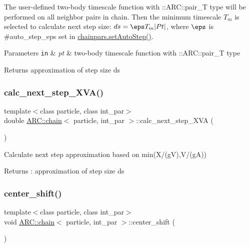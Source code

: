 The user-\/defined two-\/body timescale function with \+::\+A\+R\+C\+::pair\+\_\+T type will be performed on all neighbor pairs in chain. Then the minimum timescale $ T_m$ is selected to calculate next step size\+: $ ds = \eps T_m |Pt|$, where $\eps$ is \#auto\+\_\+step\+\_\+eps set in \hyperlink{classARC_1_1chainpars_a2aa8600eba0330eb16c122a58edbb465}{chainpars.\+set\+Auto\+Step()}. 
\begin{DoxyParams}[1]{Parameters}
\mbox{\tt in}  & {\em pt} & two-\/body timescale function with \+::\+A\+R\+C\+::pair\+\_\+T type \\
\hline
\end{DoxyParams}
\begin{DoxyReturn}{Returns}
approximation of step size ds 
\end{DoxyReturn}
\hypertarget{classARC_1_1chain_a282545e539f7402b1d44bf285730490a}{}\label{classARC_1_1chain_a282545e539f7402b1d44bf285730490a} 
\subsubsection{\texorpdfstring{calc\+\_\+next\+\_\+step\+\_\+\+X\+V\+A()}{calc\_next\_step\_XVA()}}
{\footnotesize\ttfamily template$<$class particle, class int\+\_\+par$>$ \\
double \hyperlink{classARC_1_1chain}{A\+R\+C\+::chain}$<$ particle, int\+\_\+par $>$\+::calc\+\_\+next\+\_\+step\+\_\+\+X\+VA (\begin{DoxyParamCaption}{ }\end{DoxyParamCaption})\hspace{0.3cm}{\ttfamily [inline]}}



Calculate next step approximation based on min(X/(gV),V/(gA)) 

\begin{DoxyReturn}{Returns}
\+: approximation of step size ds 
\end{DoxyReturn}
\hypertarget{classARC_1_1chain_a73419f14f724668f4858a13c01cf7b70}{}\label{classARC_1_1chain_a73419f14f724668f4858a13c01cf7b70} 
\subsubsection{\texorpdfstring{center\+\_\+shift()}{center\_shift()}}
{\footnotesize\ttfamily template$<$class particle, class int\+\_\+par$>$ \\
void \hyperlink{classARC_1_1chain}{A\+R\+C\+::chain}$<$ particle, int\+\_\+par $>$\+::center\+\_\+shift (\begin{DoxyParamCaption}{ }\end{DoxyParamCaption})\hspace{0.3cm}{\ttfamily [inline]}}



